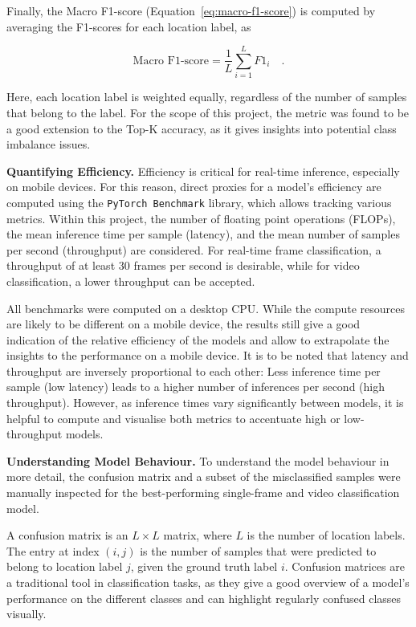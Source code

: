 \documentclass[a4paper]{article}
\begin{document}
Finally, the Macro F1-score (Equation~\ref{eq:macro-f1-score}) is computed by
averaging the F1-scores for each location label, as

\begin{equation}
  \text{Macro F1-score} = \frac{1}{L} \sum_{i=1}^{L} F1_i \quad .
  \label{eq:macro-f1-score}
\end{equation}

Here, each location label is weighted equally, regardless of the number of
samples that belong to the label. For the scope of this project, the metric was
found to be a good extension to the Top-K accuracy, as it gives insights into
potential class imbalance issues.

\textbf{Quantifying Efficiency.} Efficiency is critical for real-time inference,
especially on mobile devices. For this reason, direct proxies for a model's
efficiency are computed using the \texttt{PyTorch Benchmark} library, which
allows tracking various metrics. Within this project, the number of floating
point operations (FLOPs), the mean inference time per sample (latency), and the
mean number of samples per second (throughput) are considered. For real-time
frame classification, a throughput of at least 30 frames per second is
desirable, while for video classification, a lower throughput can be accepted.

All benchmarks were computed on a desktop CPU. While the compute resources are
likely to be different on a mobile device, the results still give a good
indication of the relative efficiency of the models and allow to extrapolate the
insights to the performance on a mobile device. It is to be noted that latency
and throughput are inversely proportional to each other: Less inference time per
sample (low latency) leads to a higher number of inferences per second (high
throughput). However, as inference times vary significantly between models, it is
helpful to compute and visualise both metrics to accentuate high or
low-throughput models.

\textbf{Understanding Model Behaviour.}  To understand the model behaviour in
more detail, the confusion matrix and a subset of the misclassified samples were
manually inspected for the best-performing single-frame and video classification
model. 

A confusion matrix is an $L \times L$ matrix, where $L$ is the number of
location labels. The entry at index $(i,j)$ is the number of samples that were
predicted to belong to location label $j$, given the ground truth label $i$.
Confusion matrices are a traditional tool in classification tasks, as they give
a good overview of a model's performance on the different classes and can
highlight regularly confused classes visually.
\end{document}
